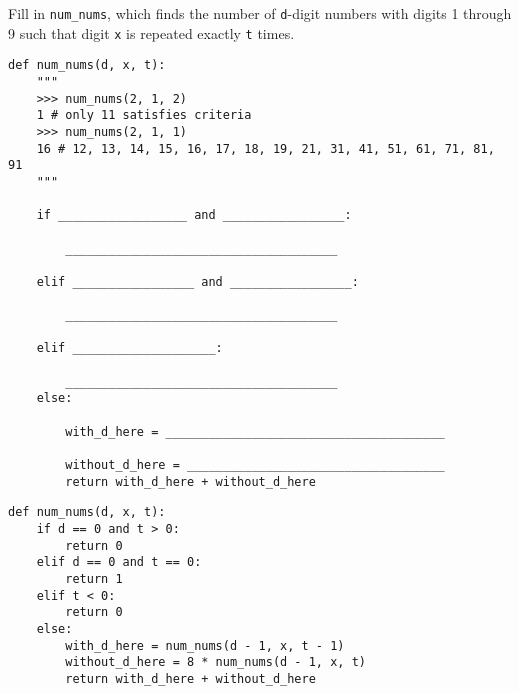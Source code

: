 \question
Fill in \lstinline{num_nums}, which finds the number of \lstinline{d}-digit numbers with digits 1 through 9 such that digit \lstinline{x} is repeated exactly \lstinline{t} times.

\begin{lstlisting}
def num_nums(d, x, t):
    """
    >>> num_nums(2, 1, 2)
    1 # only 11 satisfies criteria
    >>> num_nums(2, 1, 1)
    16 # 12, 13, 14, 15, 16, 17, 18, 19, 21, 31, 41, 51, 61, 71, 81, 91
    """

    if __________________ and _________________:

        ______________________________________

    elif _________________ and _________________:

        ______________________________________

    elif ____________________:

        ______________________________________
    else:

        with_d_here = _______________________________________

        without_d_here = ____________________________________
        return with_d_here + without_d_here
\end{lstlisting}

\begin{blocksection}
\begin{solution}
\begin{lstlisting}
def num_nums(d, x, t):
    if d == 0 and t > 0:
        return 0
    elif d == 0 and t == 0:
        return 1
    elif t < 0:
        return 0
    else:
        with_d_here = num_nums(d - 1, x, t - 1)
        without_d_here = 8 * num_nums(d - 1, x, t)
        return with_d_here + without_d_here
\end{lstlisting}
\end{solution}
\end{blocksection}